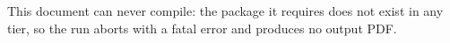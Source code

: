 \documentclass[11pt]{article}
\begin{document}
This document can never compile: the package it requires does not exist in any
tier, so the run aborts with a fatal error and produces no output PDF.
\end{document}

